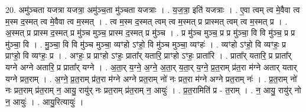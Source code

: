 \documentclass[17pt]{extarticle}
\begin{document}
20. अमु॑ञ्चता यजत्रा यजत्रा॒ अमु॑ञ्च॒ता मु॑ञ्चता यजत्राः । . य॒ज॒त्रा॒ इति॑ यजत्राः । . ए॒वा त्वम् त्व मे॒वैवा त्व म॒स्म द॒स्मत् त्व मे॒वैवा त्व म॒स्मत् । . त्व म॒स्म द॒स्मत् त्वम् त्व म॒स्मत् प्र प्रास्मत् त्वम् त्व म॒स्मत् प्र । . अ॒स्मत् प्र प्रास्म द॒स्मत् प्र मु॑ञ्च मुञ्च॒ प्रास्म द॒स्मत् प्र मु॑ञ्च । . प्र मु॑ञ्च मुञ्च॒ प्र प्र मु॑ञ्चा॒ वि वि मु॑ञ्च॒ प्र प्र मु॑ञ्चा॒ वि । . मु॒ञ्चा॒ वि वि मु॑ञ्च मुञ्चा॒ व्यꣳहो ऽꣳहो॒ वि मु॑ञ्च मुञ्चा॒ व्यꣳहः॑ । . व्यꣳहो ऽꣳहो॒ वि व्यꣳहः॒ प्र प्राꣳहो॒ वि व्यꣳहः॒ प्र । . अꣳहः॒ प्र प्राꣳहो ऽꣳहः॒ प्राता᳚र् यतारि॒ प्राꣳहो ऽꣳहः॒ प्राता॑रि । . प्राता᳚र् यतारि॒ प्र प्राता᳚र् यग्ने अग्ने अतारि॒ प्र प्राता᳚र् यग्ने । . अ॒ता॒र् य॒ग्ने॒ अ॒ग्ने॒ अ॒ता॒र् य॒ता॒र् य॒ग्ने॒ प्र॒त॒राम् प्र॑त॒रा म॑ग्ने अतार् यतार् यग्ने प्रत॒राम् । . अ॒ग्ने॒ प्र॒त॒राम् प्र॑त॒रा म॑ग्ने अग्ने प्रत॒राम् नो॑ नः प्रत॒रा म॑ग्ने अग्ने प्रत॒राम् नः॑ । . प्र॒त॒राम् नो॑ नः प्रत॒राम् प्र॑त॒राम् न॒ आयु॒ रायु॑र् नः प्रत॒राम् प्र॑त॒राम् न॒ आयुः॑ । . प्र॒त॒रामिति॑ प्र - त॒राम् । . न॒ आयु॒ रायु॑र् नो न॒ आयुः॑ । . आयु॒रित्यायुः॑ । \newline
\pagebreak
\end{document}
